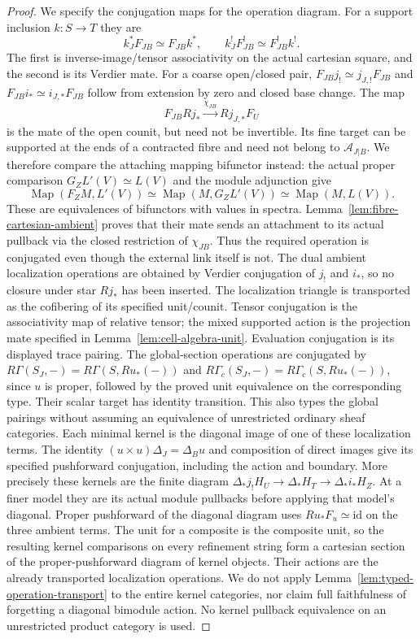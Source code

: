 \documentclass[11pt]{article}
\theoremstyle{definition}
\theoremstyle{remark}
\begin{document}
\begin{proof}
We specify the conjugation maps for the operation diagram.  For a
support inclusion $k:S\to T$ they are
\[
 k_J^*F_{JB}\simeq F_{JB}k^*,\qquad
 k_J^!F_{JB}^{!}\simeq F_{JB}^{!}k^!.
\]
The first is inverse-image/tensor associativity on the actual cartesian
square, and the second is its Verdier mate.  For a coarse open/closed
pair, $F_{JB}j_!\simeq j_{J,!}F_{JB}$ and
$F_{JB}i_*\simeq i_{J,*}F_{JB}$ follow from extension by zero and
closed base change.  The map
\[
 F_{JB}Rj_*\xrightarrow{\chi_{JB}}Rj_{J,*}F_U
\]
is the mate of the open counit, but need not be invertible.  Its
fine target can be supported at the ends of a contracted fibre and
need not belong to $\mathcal A_{J|B}$.  We therefore compare the
attaching mapping bifunctor instead: the actual proper comparison
$G_ZL'(V)\simeq L(V)$ and the module adjunction give
\[
 \operatorname{Map}(F_ZM,L'(V))\simeq
 \operatorname{Map}(M,G_ZL'(V))\simeq\operatorname{Map}(M,L(V)).
\]
These are equivalences of bifunctors with values in spectra.
Lemma~\ref{lem:fibre-cartesian-ambient} proves that their mate sends
an attachment to its actual pullback via the closed restriction of
$\chi_{JB}$.  Thus the required operation is conjugated even though
the external link itself is not.  The dual ambient localization
operations are obtained by Verdier conjugation of $j_!$ and $i_*$,
so no closure under star $Rj_*$ has been inserted.
The localization triangle is transported as the cofibering of its
specified unit/counit.  Tensor conjugation is the associativity map
of relative tensor; the mixed supported action is the projection mate
specified in Lemma~\ref{lem:cell-algebra-unit}.  Evaluation conjugation
is its displayed trace pairing.  The global-section operations are
conjugated by $R\Gamma(S_J,-)=R\Gamma(S,Ru_*(-))$ and
$R\Gamma_c(S_J,-)=R\Gamma_c(S,Ru_*(-))$, since $u$ is proper,
followed by the proved unit equivalence on the corresponding type.
Their scalar target has identity transition.  This also types the
global pairings without assuming an equivalence of unrestricted
ordinary sheaf categories.  Each minimal kernel is the diagonal
image of one of these localization terms.  The identity
$(u\times u)\Delta_J=\Delta_Bu$ and composition of direct images give
its specified pushforward conjugation, including the action and boundary.
More precisely these kernels are the finite diagram
$\Delta_*j_!H_U\to\Delta_*H_T\to\Delta_*i_*H_Z$.
At a finer model they are its actual module pullbacks before applying
that model's diagonal.  Proper pushforward of the diagonal diagram
uses $Ru_*F_u\simeq\mathrm{id}$ on the three ambient terms.  The
unit for a composite is the composite unit, so the resulting kernel
comparisons on every refinement string form a cartesian section of
the proper-pushforward diagram of kernel objects.  Their actions are
the already transported localization operations.  We do not apply
Lemma~\ref{lem:typed-operation-transport} to the entire kernel categories,
nor claim full faithfulness of forgetting a diagonal bimodule action.
No kernel pullback equivalence on an unrestricted product category is used.


\end{proof}
\end{document}
